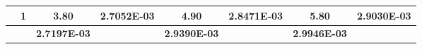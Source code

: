 \begin{table}
\begin{tabular}{|rr|r|r|r|r|r|r|}
  \cline{2-8}    \rowcolor[rgb]{ .788,  .788,  .788} \multicolumn{1}{|c|}{} & \multicolumn{1}{c|}{\cellcolor[rgb]{ 1,  1,  1}1} & \multicolumn{1}{c|}{\cellcolor[rgb]{ 1,  1,  1}3.80} & \cellcolor[rgb]{ 1,  1,  1}2.7052E-03 & \multicolumn{1}{c|}{\cellcolor[rgb]{ 1,  1,  1}4.90} & \cellcolor[rgb]{ 1,  1,  1}2.8471E-03 & \multicolumn{1}{c|}{\cellcolor[rgb]{ 1,  1,  1}5.80} & \cellcolor[rgb]{ 1,  1,  1}2.9030E-03 \bigstrut\\
      \hline
      \rowcolor[rgb]{ .788,  .788,  .788} \multicolumn{2}{|r|}{\small{Promedio}} & \cellcolor[rgb]{ 0,  0,  0} & \cellcolor[rgb]{ .949,  .949,  .949}\textcolor[rgb]{ .247,  .247,  .247}{\textbf{2.7197E-03}} & \cellcolor[rgb]{ 0,  0,  0} & \cellcolor[rgb]{ .949,  .949,  .949}\textcolor[rgb]{ .247,  .247,  .247}{\textbf{2.9390E-03}} & \cellcolor[rgb]{ 0,  0,  0} & \cellcolor[rgb]{ .949,  .949,  .949}\textcolor[rgb]{ .247,  .247,  .247}{\textbf{2.9946E-03}} \bigstrut[t]\\
      \end{tabular}%
    \label{tab:table1}%
  \end{table}%